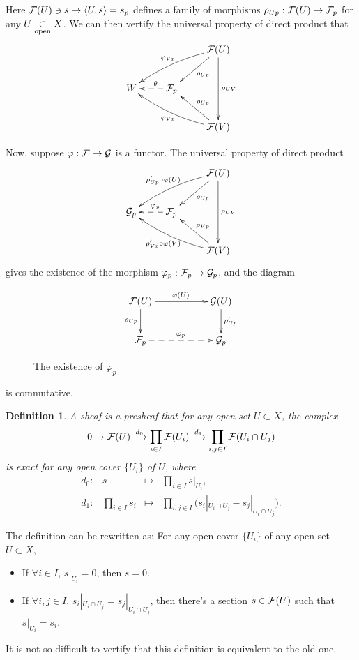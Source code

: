 \documentclass[9pt]{extarticle}
\theoremstyle{plain}
\newtheorem{defi}{Definition}
\begin{document}
Here $\mathcal{F}(U)\ni s\mapsto \langle U,s\rangle=s_p$ defines a family of morphisms $\rho_{Up}:\mathcal{F}(U)\to \mathcal{F}_p$ for any $U\underset{\mathrm{open}}{\subset} X$. We can then vertify the universal property of direct product that
\[
\begin{xy}
	\xymatrix{
	&&\ar[dl]^{\rho_{Up}}\calf(U)\ar[dd]^{\rho_{UV}}\ar@/_/[lld]_{\varphi_{Vp}} \\
	W&\ar@{-->}[l]_(0.4){\theta}\calf_p&\\
	&&\ar[ul]_{\rho_{Up}}\calf(V)\ar@/^/[llu]^{\varphi_{Vp}}
	}
\end{xy}
\]

Now, suppose $\varphi:\mathcal{F} \to \mathcal{G}$ is a functor. The universal property of direct product 
\[
	\begin{xy}
	\xymatrix{
		&&\ar[dl]^{\rho_{Up}}\calf(U)\ar[dd]^{\rho_{UV}}\ar@/_/[lld]_{\rho'_{Up}\circ\varphi(U)} \\
		\calg_p&\ar@{-->}[l]_(0.4){\varphi_p}\calf_p&\\
		&&\ar[ul]_{\rho_{Vp}}\calf(V)\ar@/^/[llu]^{\rho'_{Vp}\circ\varphi(V)}
	}
	\end{xy}
\]
gives the existence of the morphism $\varphi_p:\mathcal{F}_p\to \mathcal{G}_p$, and the diagram
\begin{figure}[h]
\[
\begin{xy}
	\xymatrix{
		\calf(U)\ar[rr]^{\varphi(U)} \ar[d]_{\rho_{Up}}&&\calg(U) \ar[d]^{\rho'_{Up}}\\
		\calf_p\ar@{-->}[rr]^{\varphi_p}&&\calg_p
	}
\end{xy}
\]
\caption{The existence of $\varphi_p$}
\label{fig1}
\end{figure}

\noindent is commutative.
\begin{defi}
	A sheaf is a presheaf that for any open set $U\subset X$, the complex 
\[
	0\rightarrow \mathcal{F}(U) \xrightarrow{d_0}\prod_{i\in I}\mathcal{F}(U_i) \xrightarrow{d_1}\prod_{i,j\in I}\mathcal{F}(U_i\cap U_j)
\]
is exact for any open cover $\{U_i\}$ of $U$, where
\[
\begin{array}{cccl}
	d_0:&s&\mapsto& \displaystyle{\prod_{i\in I}s|_{U_i}},\\
	d_1:&\displaystyle{\prod_{i\in I}s_i}&\mapsto& \displaystyle{\prod_{i,j\in I}\bigl(s_i|_{U_i\cap U_j}-s_j|_{U_i\cap U_j}\bigr)}.
\end{array}
\]
\end{defi}

The definition can be rewritten as: For any open cover $\{U_i\}$ of any open set $U\subset X$,
\begin{itemize}
\item If $\forall i\in I$, $s|_{U_i}=0$, then $s=0$.

\item If $\forall i,j\in I$, $s_i|_{U_i\cap U_j}=s_j|_{U_i\cap U_j}$, then there's a section $s\in\mathcal{F}(U)$ such that $s|_{U_i}=s_i$.
\end{itemize}
It is not so difficult to vertify that this definition is equivalent to the old one.
\end{document}
